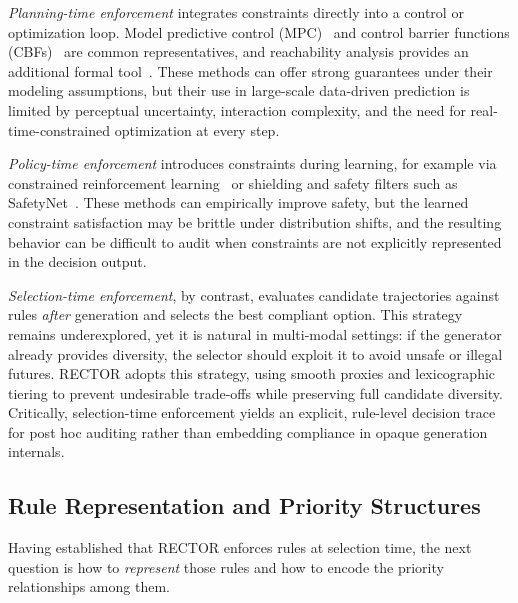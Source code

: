 \textit{Planning-time enforcement} integrates constraints directly into a control or optimization loop.  Model predictive control (MPC)~\cite{borrelli2005mpc} and control barrier functions (CBFs)~\cite{ames2017control} are common representatives, and reachability analysis provides an additional formal tool~\cite{althoff2010reachability}.  These methods can offer strong guarantees under their modeling assumptions, but their use in large-scale data-driven prediction is limited by perceptual uncertainty, interaction complexity, and the need for real-time-constrained optimization at every step.

\textit{Policy-time enforcement} introduces constraints during learning, for example via constrained reinforcement learning~\cite{altman1999constrained,achiam2017constrained} or shielding and safety filters such as SafetyNet~\cite{vitelli2022safetynet}.  These methods can empirically improve safety, but the learned constraint satisfaction may be brittle under distribution shifts, and the resulting behavior can be difficult to audit when constraints are not explicitly represented in the decision output.

\textit{Selection-time enforcement}, by contrast, evaluates candidate trajectories against rules \emph{after} generation and selects the best compliant option.  This strategy remains underexplored, yet it is natural in multi-modal settings: if the generator already provides diversity, the selector should exploit it to avoid unsafe or illegal futures.  \textsc{RECTOR} adopts this strategy, using smooth proxies and lexicographic tiering to prevent undesirable trade-offs while preserving full candidate diversity.  Critically, selection-time enforcement yields an explicit, rule-level decision trace for post hoc auditing rather than embedding compliance in opaque generation internals.

\subsection{Rule Representation and Priority Structures}
\label{subsec:rule_representation_priority}

Having established that RECTOR enforces rules at selection time, the next question is how to \emph{represent} those rules and how to encode the priority relationships among them.

